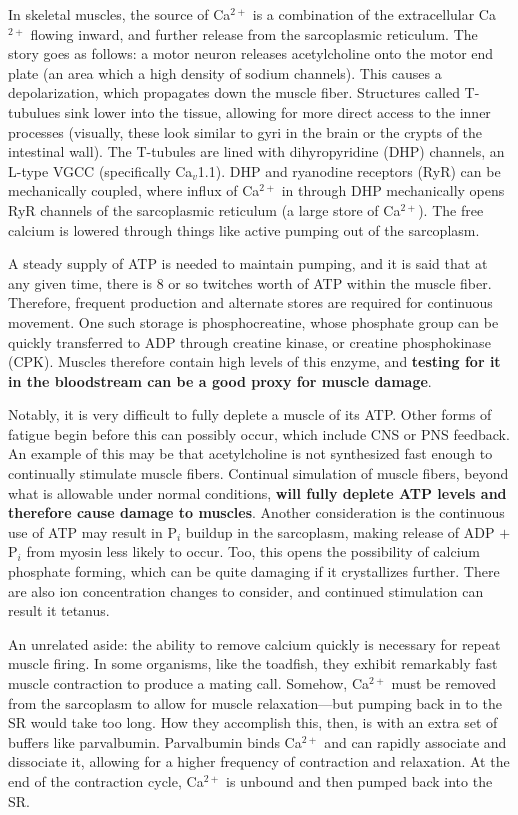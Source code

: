 In skeletal muscles, the source of Ca$^{2+}$ is a combination of the extracellular Ca$^{2+}$ flowing inward, and further release from the sarcoplasmic reticulum. The story goes as follows: a motor neuron releases acetylcholine onto the motor end plate (an area which a high density of sodium channels). This causes a depolarization, which propagates down the muscle fiber. Structures called T-tubulues sink lower into the tissue, allowing for more direct access to the inner processes (visually, these look similar to gyri in the brain or the crypts of the intestinal wall). The T-tubules are lined with dihyropyridine (DHP) channels, an L-type VGCC (specifically Ca$_v$1.1). DHP and ryanodine receptors (RyR) can be mechanically coupled, where influx of Ca$^{2+}$ in through DHP mechanically opens RyR channels of the sarcoplasmic reticulum (a large store of Ca$^{2+}$). The free calcium is lowered through things like active pumping out of the sarcoplasm. \newline

A steady supply of ATP is needed to maintain pumping, and it is said that at any given time, there is 8 or so twitches worth of ATP within the muscle fiber. Therefore, frequent production and alternate stores are required for continuous movement. One such storage is phosphocreatine, whose phosphate group can be quickly transferred to ADP through creatine kinase, or creatine phosphokinase (CPK). Muscles therefore contain high levels of this enzyme, and \textbf{testing for it in the bloodstream can be a good proxy for muscle damage}.\newline

Notably, it is very difficult to fully deplete a muscle of its ATP. Other forms of fatigue begin before this can possibly occur, which include CNS or PNS feedback. An example of this may be that acetylcholine is not synthesized fast enough to continually stimulate muscle fibers. Continual simulation of muscle fibers, beyond what is allowable under normal conditions, \textbf{will fully deplete ATP levels and therefore cause damage to muscles}. Another consideration is the continuous use of ATP may result in P$_i$ buildup in the sarcoplasm, making release of ADP $+$ P$_i$ from myosin less likely to occur. Too, this opens the possibility of calcium phosphate forming, which can be quite damaging if it crystallizes further. There are also ion concentration changes to consider, and continued stimulation can result it tetanus.\newline

An unrelated aside: the ability to remove calcium quickly is necessary for repeat muscle firing. In some organisms, like the toadfish, they exhibit remarkably fast muscle contraction to produce a mating call. Somehow, Ca$^{2+}$ must be removed from the sarcoplasm to allow for muscle relaxation---but pumping back in to the SR would take too long. How they accomplish this, then, is with an extra set of buffers like parvalbumin. Parvalbumin binds Ca$^{2+}$ and can rapidly associate and dissociate it, allowing for a higher frequency of contraction and relaxation. At the end of the contraction cycle, Ca$^{2+}$ is unbound and then pumped back into the SR. 


